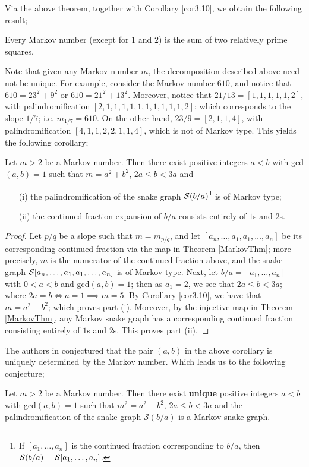 Via the above theorem, together with Corollary \ref{cor3.10}, we obtain the following result;
\begin{corollary}
    Every Markov number (except for $1$ and $2$) is the sum of two relatively prime squares.
\end{corollary}
Note that given any Markov number $m$, the decomposition described above need not be unique. For example, consider the Markov number $610$, and notice that $610 = 23^2 + 9^2$ or $610 = 21^2 + 13^2$. Moreover, notice that $21/13 = [1,1,1,1,1,2]$, with palindromification $[2,1,1,1,1,1,1,1,1,1,1,2]$; which corresponds to the slope $1/7$; i.e. $m_{1/7} = 610$. On the other hand, $23/9 = [2,1,1,4]$, with palindromification $[4,1,1,2,2,1,1,4]$, which is not of Markov type. This yields the following corollary;
\begin{corollary}
    Let $m>2$ be a Markov number. Then there exist positive integers $a<b$ with gcd$(a,b) = 1$ such that $m = a^2 + b^2$, $2a \leq b < 3a$ and
    \begin{itemize}
        \item[(i)] the palindromification of the snake graph $\mathcal{S}(b/a)$\footnote{If $[a_1,\dots,a_n]$ is the continued fraction corresponding to $b/a$, then $\mathcal{S}(b/a) = \mathcal{S}[a_1,\dots,a_n]$.} is of Markov type;
        \item[(ii)] the continued fraction expansion of $b/a$ consists entirely of $1$s and $2$s.
    \end{itemize}
\end{corollary}
\begin{proof}
    Let $p/q$ be a slope such that $m = m_{p/q}$, and let $[a_n,\dots,a_1,a_1,\dots,a_n]$ be its corresponding continued fraction via the map in Theorem \ref{MarkovThm}; more precisely, $m$ is the numerator of the continued fraction above, and the snake graph $\mathcal{S}[a_n,\dots,a_1,a_1,\dots,a_n]$ is of Markov type. Next, let $b/a = [a_1,\dots,a_n]$ with $0<a<b$ and gcd$(a,b) = 1$; then as $a_1= 2$, we see that $2a \leq b < 3a$; where $2a = b \iff a = 1 \implies m = 5$. By Corollary \ref{cor3.10}, we have that $m = a^2 + b^2$; which proves part (i). Moreover, by the injective map in Theorem \ref{MarkovThm}, any Markov snake graph has a corresponding continued fraction consisting entirely of $1$s and $2$s. This proves part (ii). 
\end{proof}
The authors in \cite{CS1} conjectured that the pair $(a,b)$ in the above corollary is uniquely determined by the Markov number. Which leads us to the following conjecture;
\begin{conjecture}\label{firstconj}
    Let $m>2$ be a Markov number. Then there exist \textbf{unique} positive integers $a<b$ with gcd$(a,b)=1$ such that $m^2 = a^2 + b^2$, $2a \leq b < 3a$ and the palindromification of the snake graph $\mathcal{S}(b/a)$ is a Markov snake graph.  
\end{conjecture}
